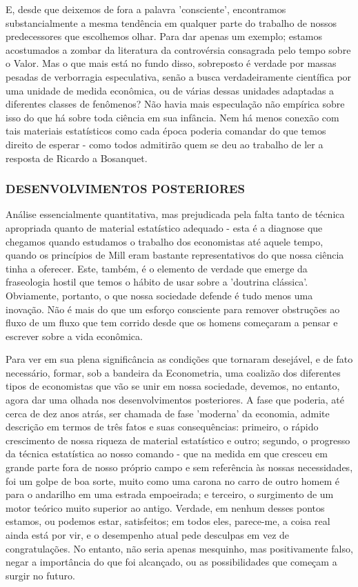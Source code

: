 \documentclass[12pt]{article}
\begin{document}
E, desde que deixemos de fora a palavra 'consciente', encontramos substancialmente a mesma tendência em qualquer parte do trabalho de nossos predecessores que escolhemos olhar. Para dar apenas um exemplo; estamos acostumados a zombar da literatura da controvérsia consagrada pelo tempo sobre o Valor. Mas o que mais está no fundo disso, sobreposto é verdade por massas pesadas de verborragia especulativa, senão a busca verdadeiramente científica por uma unidade de medida econômica, ou de várias dessas unidades adaptadas a diferentes classes de fenômenos? Não havia mais especulação não empírica sobre isso do que há sobre toda ciência em sua infância. Nem há menos conexão com tais materiais estatísticos como cada época poderia comandar do que temos direito de esperar - como todos admitirão quem se deu ao trabalho de ler a resposta de Ricardo a Bosanquet.

\subsubsection{\textbf{DESENVOLVIMENTOS POSTERIORES}}

Análise essencialmente quantitativa, mas prejudicada pela falta tanto de técnica apropriada quanto de material estatístico adequado - esta é a diagnose que chegamos quando estudamos o trabalho dos economistas até aquele tempo, quando os princípios de Mill eram bastante representativos do que nossa ciência tinha a oferecer. Este, também, é o elemento de verdade que emerge da fraseologia hostil que temos o hábito de usar sobre a 'doutrina clássica'. Obviamente, portanto, o que nossa sociedade defende é tudo menos uma inovação. Não é mais do que um esforço consciente para remover obstruções ao fluxo de um fluxo que tem corrido desde que os homens começaram a pensar e escrever sobre a vida econômica.

Para ver em sua plena significância as condições que tornaram desejável, e de fato necessário, formar, sob a bandeira da Econometria, uma coalizão dos diferentes tipos de economistas que vão se unir em nossa sociedade, devemos, no entanto, agora dar uma olhada nos desenvolvimentos posteriores. A fase que poderia, até cerca de dez anos atrás, ser chamada de fase 'moderna' da economia, admite descrição em termos de três fatos e suas consequências: primeiro, o rápido crescimento de nossa riqueza de material estatístico e outro; segundo, o progresso da técnica estatística ao nosso comando - que na medida em que cresceu em grande parte fora de nosso próprio campo e sem referência às nossas necessidades, foi um golpe de boa sorte, muito como uma carona no carro de outro homem é para o andarilho em uma estrada empoeirada; e terceiro, o surgimento de um motor teórico muito superior ao antigo. Verdade, em nenhum desses pontos estamos, ou podemos estar, satisfeitos; em todos eles, parece-me, a coisa real ainda está por vir, e o desempenho atual pede desculpas em vez de congratulações. No entanto, não seria apenas mesquinho, mas positivamente falso, negar a importância do que foi alcançado, ou as possibilidades que começam a surgir no futuro.
\end{document}
